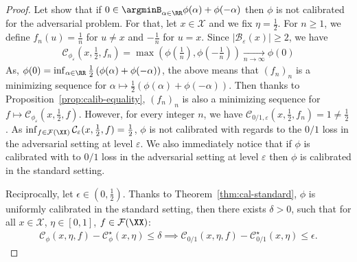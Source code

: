 \begin{proof}

Let show that if $0\in\argminB_{\alpha\in\RR} \phi(\alpha)+\phi(-\alpha)$ then $\phi$ is not calibrated for the adversarial problem. For that, let $x\in\mathcal{X}$ and we fix $\eta = \frac12$.  For $n\geq1$, we define $f_n(u) = \frac1n$ for $u\neq x$ and $-\frac{1}{n}$ for $u=x$.  Since $\lvert\mathcal{B}_\varepsilon(x)\rvert\geq 2$, we have
\begin{align*}
     \mathcal{C}_{\phi_\varepsilon}(x,\frac12,f_n) = \max\left(\phi(\frac1n),\phi(-\frac1n)\right)\xrightarrow[n\to\infty]{} \phi(0) %
\end{align*}
As, $\phi(0) = \inf_{\alpha\in\RR}\frac12\left(\phi(\alpha)+\phi(-\alpha)\right)$, the above means that $(f_n)_n$ is a minimizing sequence for $\alpha \mapsto \frac12 \left(\phi(\alpha)+\phi(-\alpha)\right)$. 
Then thanks to Proposition~\ref{prop:calib-equality}, $(f_n)_n$ is also a minimizing sequence for $f \mapsto\mathcal{C}_{\phi_\varepsilon}(x,\frac12,f)$. However, for every integer $n$, we have $\mathcal{C}_{0/1,\varepsilon}(x,\frac12,f_n) =1\neq\frac12$. As  $\inf_{f\in\mathcal{F}(\XX)}\mathcal{C}_{\varepsilon}(x,\frac12,f)=\frac12$, $\phi$ is not calibrated with regards to the $0/1$ loss in the adversarial setting at level $\varepsilon$. We also immediately notice that if $\phi$ is  calibrated with to  $0/1$ loss in the adversarial setting at level $\varepsilon$ then $\phi$ is calibrated in the standard setting. 


\medskip

Reciprocally, let $\epsilon\in(0,\frac{1}{2})$. Thanks to Theorem~\ref{thm:cal-standard}, $\phi$ is uniformly calibrated in the standard setting, then there exists $\delta>0$, such that for all $x\in\mathcal{X}$, $\eta\in [0,1]$, $f\in \mathcal{F}(\XX)$:
\begin{align*}
    \mathcal{C}_\phi(x,\eta,f) - \mathcal{C}_\phi^\star(x,\eta)\leq \delta \implies \mathcal{C}_{0/1}(x,\eta,f) - \mathcal{C}_{0/1}^\star(x,\eta)\leq \epsilon.
\end{align*}



\end{proof}
